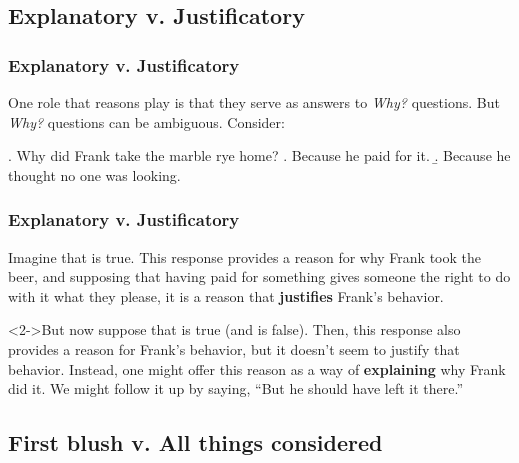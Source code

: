 \documentclass[10pt,letterpaper,xcolor=dvipsnames,handout]{beamer}
\begin{document}
\subsection{Explanatory v. Justificatory}

\begin{frame}
\frametitle{Explanatory v. Justificatory}

One role that reasons play is that they serve as answers to \textit{Why?} questions.  But \textit{Why?} questions can be ambiguous.  Consider:

\ex. Why did Frank take the marble rye home?
  \a. Because he paid for it.
  \b. Because he thought no one was looking.


\end{frame}


\begin{frame}
\frametitle{Explanatory v. Justificatory}

\begin{block}{Imagine that \Last[a] is true.} 
This response provides a reason for why Frank took the beer, and supposing that having paid for something gives someone the right to do with it what they please, it is a reason that \textbf{justifies} Frank's behavior.
\end{block}

\begin{block}<2->{But now suppose that \Last[b] is true (and \Last[a] is false).}
Then, this response also provides a reason for Frank's behavior, but it doesn't seem to justify that behavior.  Instead, one might offer this reason as a way of \textbf{explaining} why Frank did it. We might follow it up by saying, ``But he should have left it there.''
\end{block}

\end{frame}

\subsection{First blush v. All things considered}
\end{document}

